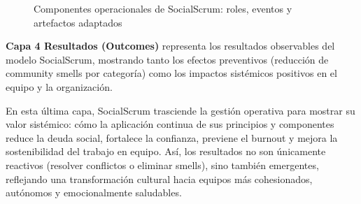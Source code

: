 \begin{figure}[!htbp]
    \caption{Componentes operacionales de SocialScrum: roles, eventos y artefactos adaptados}
    \label{fig:componentes_operacionales}
\end{figure}

\FloatBarrier

\textbf{Capa 4 Resultados (Outcomes)} representa los resultados observables del modelo SocialScrum, mostrando tanto los efectos preventivos (reducción de community smells por categoría) como los impactos sistémicos positivos en el equipo y la organización.

En esta última capa, SocialScrum trasciende la gestión operativa para mostrar su valor sistémico: cómo la aplicación continua de sus principios y componentes reduce la deuda social, fortalece la confianza, previene el burnout y mejora la sostenibilidad del trabajo en equipo.
Así, los resultados no son únicamente reactivos (resolver conflictos o eliminar smells), sino también emergentes, reflejando una transformación cultural hacia equipos más cohesionados, autónomos y emocionalmente saludables.

